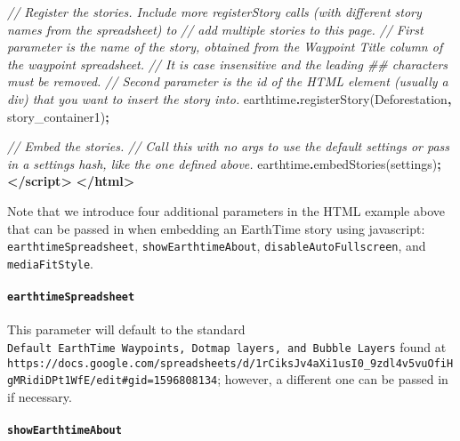 \documentclass[
  12pt,
]{krantz}
\makeatletter
\newenvironment{Shaded}{\begin{snugshade}}{\end{snugshade}}
\newcommand{\CommentTok}[1]{\textcolor[rgb]{0.37,0.37,0.37}{\textit{#1}}}
\newcommand{\FunctionTok}[1]{\textcolor[rgb]{0,0,0}{#1}}
\newcommand{\KeywordTok}[1]{\textcolor[rgb]{0.27,0.27,0.27}{\textbf{#1}}}
\newcommand{\NormalTok}[1]{#1}
\newcommand{\OperatorTok}[1]{\textcolor[rgb]{0.43,0.43,0.43}{\textbf{#1}}}
\newcommand{\StringTok}[1]{\textcolor[rgb]{0.5,0.5,0.5}{#1}}
\newenvironment{kframe}{%
\medskip{}
\setlength{\fboxsep}{.8em}
 \def\at@end@of@kframe{}%
 \ifinner\ifhmode%
  \def\at@end@of@kframe{\end{minipage}}%
  \begin{minipage}{\columnwidth}%
 \fi\fi%
 \def\FrameCommand##1{\hskip\@totalleftmargin \hskip-\fboxsep
 \colorbox{shadecolor}{##1}\hskip-\fboxsep
     \hskip-\linewidth \hskip-\@totalleftmargin \hskip\columnwidth}%
 \MakeFramed {\advance\hsize-\width
   \@totalleftmargin\z@ \linewidth\hsize
   \@setminipage}}%
 {\par\unskip\endMakeFramed%
 \at@end@of@kframe}
\renewenvironment{Shaded}{\begin{kframe}}{\end{kframe}}
\makeatother
\begin{document}
\begin{Shaded}
\begin{Highlighting}[]
    \CommentTok{// Register the stories. Include more registerStory calls (with different story names from the spreadsheet) to }
    \CommentTok{// add multiple stories to this page.}
    \CommentTok{// First parameter is the name of the story, obtained from the \textquotesingle{}Waypoint Title\textquotesingle{} column of the waypoint spreadsheet. }
    \CommentTok{// It is case insensitive and the leading \textquotesingle{}\#\#\textquotesingle{} characters must be removed.}
    \CommentTok{// Second parameter is the id of the HTML element (usually a div) that you want to insert the story into.}
\NormalTok{    earthtime}\OperatorTok{.}\FunctionTok{registerStory}\NormalTok{(}\StringTok{\textquotesingle{}Deforestation\textquotesingle{}}\OperatorTok{,} \StringTok{\textquotesingle{}story\_container1\textquotesingle{}}\NormalTok{)}\OperatorTok{;}

    \CommentTok{// Embed the stories.}
    \CommentTok{// Call this with no args to use the default settings or pass in a settings hash, like the one defined above.}
\NormalTok{    earthtime}\OperatorTok{.}\FunctionTok{embedStories}\NormalTok{(settings)}\OperatorTok{;}
  \KeywordTok{\textless{}/script\textgreater{}}
\KeywordTok{\textless{}/html\textgreater{}}
\end{Highlighting}
\end{Shaded}

Note that we introduce four additional parameters in the HTML example above that can be passed in when embedding an EarthTime story using javascript: \texttt{earthtimeSpreadsheet}, \texttt{showEarthtimeAbout}, \texttt{disableAutoFullscreen}, and \texttt{mediaFitStyle}.

\hypertarget{earthtimespreadsheet}{%
\paragraph*{\texorpdfstring{\texttt{earthtimeSpreadsheet}}{earthtimeSpreadsheet}}\label{earthtimespreadsheet}}

This parameter will default to the standard \texttt{Default\ EarthTime\ Waypoints,\ Dotmap\ layers,\ and\ Bubble\ Layers} found at \texttt{https://docs.google.com/spreadsheets/d/1rCiksJv4aXi1usI0\_9zdl4v5vuOfiHgMRidiDPt1WfE/edit\#gid=1596808134}; however, a different one can be passed in if necessary.

\hypertarget{showearthtimeabout}{%
\paragraph*{\texorpdfstring{\texttt{showEarthtimeAbout}}{showEarthtimeAbout}}\label{showearthtimeabout}}
\end{document}
